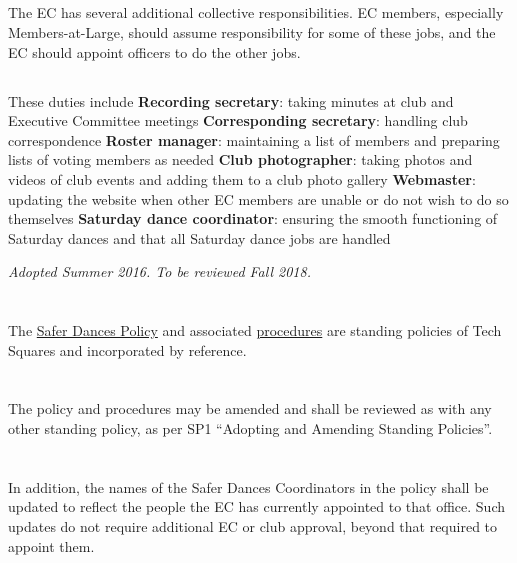 \documentclass{bylaws}
\newcommand{\sptimes}[2]{\emph{Adopted #1. To be reviewed #2.}}
\begin{document}
\subsection{}The EC has several additional collective responsibilities. EC members, especially Members-at-Large, should assume responsibility for some of these jobs, and the EC should appoint officers to do the other jobs.
\subsection{}These duties include
\duty \textbf{Recording secretary}: taking minutes at club and Executive Committee meetings
\duty \textbf{Corresponding secretary}: handling club correspondence
\duty \textbf{Roster manager}: maintaining a list of members and preparing lists of voting members as needed
\duty \textbf{Club photographer}: taking photos and videos of club events and adding them to a club photo gallery
\duty \textbf{Webmaster}: updating the website when other EC members are unable or do not wish to do so themselves
\duty \textbf{Saturday dance coordinator}: ensuring the smooth functioning of Saturday dances and that all Saturday dance jobs are handled

\sptimes{Summer 2016}{Fall 2018}

\section{} The \href{safer-dances.html}{Safer Dances Policy} and associated \href{safer-dances-procedures.html}{procedures} are standing policies of Tech Squares and incorporated by reference.
\section{} The policy and procedures may be amended and shall be reviewed as with any other standing policy, as per SP1 ``Adopting and Amending Standing Policies''.
\section{} In addition, the names of the Safer Dances Coordinators in the policy shall be updated to reflect the people the EC has currently appointed to that office. Such updates do not require additional EC or club approval, beyond that required to appoint them.
\end{document}
